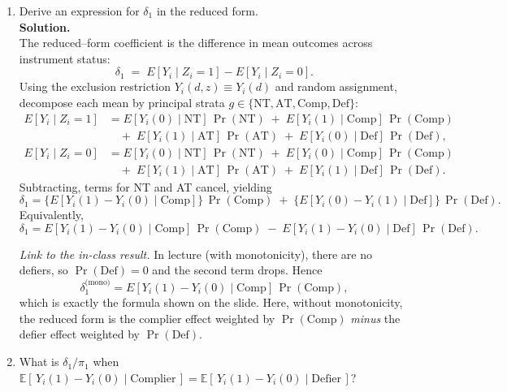 \documentclass[12pt]{article}
\begin{document}
\begin{enumerate}[label=\textbf{(\alph*)}, leftmargin=1.5em]
  \item Derive an expression for $\delta_1$ in the reduced form.\\[0.5em]
  
  \textbf{Solution.} \\
  The reduced–form coefficient is the difference in mean outcomes across instrument status:
  \[
  \delta_1 \;=\; E[Y_i\mid Z_i=1]-E[Y_i\mid Z_i=0].
  \]
  Using the exclusion restriction $Y_i(d,z)\equiv Y_i(d)$ and random assignment, decompose each mean by principal strata $g\in\{\mathrm{NT},\mathrm{AT},\mathrm{Comp},\mathrm{Def}\}$:
  \begin{align*}
    E[Y_i\mid Z_i=1]
      &= E[Y_i(0)\mid \mathrm{NT}]\,\Pr(\mathrm{NT})
      \;+\;E[Y_i(1)\mid \mathrm{Comp}]\,\Pr(\mathrm{Comp})\\
      &\quad+\;E[Y_i(1)\mid \mathrm{AT}]\,\Pr(\mathrm{AT})
      \;+\;E[Y_i(0)\mid \mathrm{Def}]\,\Pr(\mathrm{Def}),\\[0.35em]
      E[Y_i\mid Z_i=0]
      &= E[Y_i(0)\mid \mathrm{NT}]\,\Pr(\mathrm{NT})
      \;+\;E[Y_i(0)\mid \mathrm{Comp}]\,\Pr(\mathrm{Comp})\\
      &\quad+\;E[Y_i(1)\mid \mathrm{AT}]\,\Pr(\mathrm{AT})
      \;+\;E[Y_i(1)\mid \mathrm{Def}]\,\Pr(\mathrm{Def}).
  \end{align*}
  Subtracting, terms for NT and AT cancel, yielding
  \[
  \delta_1
  = \big\{E[Y_i(1)-Y_i(0)\mid \mathrm{Comp}]\big\}\,\Pr(\mathrm{Comp})
  \;+\;\big\{E[Y_i(0)-Y_i(1)\mid \mathrm{Def}]\big\}\,\Pr(\mathrm{Def}).
  \]
  Equivalently,
  \[
  \delta_1
  = E[Y_i(1)-Y_i(0)\mid \mathrm{Comp}]\,\Pr(\mathrm{Comp})
  \;-\;E[Y_i(1)-Y_i(0)\mid \mathrm{Def}]\,\Pr(\mathrm{Def}).
  \]

  \emph{Link to the in-class result.} In lecture (with monotonicity), there are no defiers, so $\Pr(\mathrm{Def})=0$ and the second term drops. Hence
  \[
  \delta_1^{\text{(mono)}} 
  = E[Y_i(1)-Y_i(0)\mid \mathrm{Comp}]\,\Pr(\mathrm{Comp}),
  \]
  which is exactly the formula shown on the slide. Here, without monotonicity, the reduced form is the complier effect weighted by $\Pr(\mathrm{Comp})$ \emph{minus} the defier effect weighted by $\Pr(\mathrm{Def})$.
  \item What is $\delta_1/\pi_1$ when $\mathbb{E}[\,Y_i(1)-Y_i(0)\mid\text{Complier}\,]=\mathbb{E}[\,Y_i(1)-Y_i(0)\mid\text{Defier}\,]$?\\[0.5em]
  

\end{enumerate}
\end{document}
